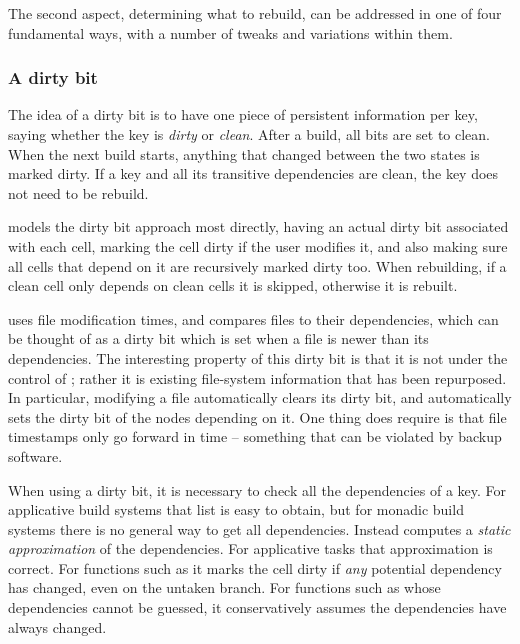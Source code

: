 The second aspect, determining what to rebuild, can be addressed in one of four
fundamental ways, with a number of tweaks and variations within them.

\vspace{-2mm}
\subsubsection{A dirty bit}\label{sec-dirty-bit}

The idea of a dirty bit is to have one piece of persistent information per key,
saying whether the key is \emph{dirty} or \emph{clean}. After a build, all bits
are set to clean. When the next build starts, anything that changed between the
two states is marked dirty.
If a key and all its transitive dependencies are clean, the key does not need
to be rebuild.

\Excel models the dirty bit approach most directly, having an actual dirty bit
associated with each cell, marking the cell dirty if the user modifies it, and
also making sure all cells that depend on it are recursively marked dirty too.
When rebuilding, if a clean cell only depends on clean cells it is skipped,
otherwise it is rebuilt.


\Make uses file modification times, and compares files to their
dependencies, which can be thought of as a dirty bit which is set when
a file is newer than its dependencies. The interesting property of
this dirty bit is that it is not under the control of \Make; rather it is
existing file-system information that has been repurposed. In particular,
modifying a file automatically clears its dirty bit, and
automatically sets the dirty bit of the nodes depending on it. One
thing \Make does require is that file timestamps only go forward in
time -- something that can be violated by backup software.

When using a dirty bit, it is necessary to check all the dependencies of a key.
For applicative build systems that list is easy to obtain, but for monadic
build systems there is no general way to get all dependencies. Instead \Excel
computes a \emph{static approximation} of the dependencies. For applicative
tasks that approximation is correct. For functions such as  it marks the
cell dirty if \emph{any} potential dependency has changed, even on the untaken
 branch. For functions such as  whose dependencies cannot
be guessed, it conservatively assumes the dependencies have always changed.

